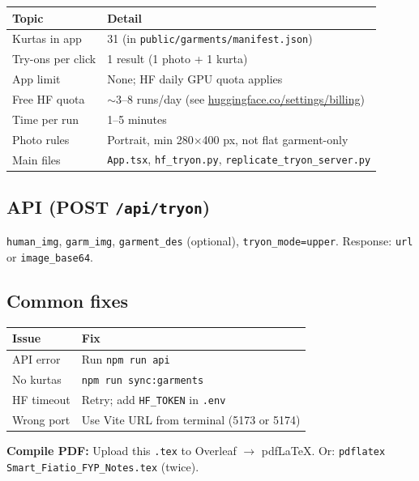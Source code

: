\documentclass[10pt,a4paper]{article}
\begin{document}
\begin{table}[h]
\centering\small
\begin{tabular}{@{}ll@{}}
\toprule
Topic & Detail \\
\midrule
Kurtas in app & 31 (in \texttt{public/garments/manifest.json}) \\
Try-ons per click & 1 result (1 photo + 1 kurta) \\
App limit & None; HF daily GPU quota applies \\
Free HF quota & $\sim$3--8 runs/day (see \url{huggingface.co/settings/billing}) \\
Time per run & 1--5 minutes \\
Photo rules & Portrait, min 280$\times$400 px, not flat garment-only \\
Main files & \texttt{App.tsx}, \texttt{hf\_tryon.py}, \texttt{replicate\_tryon\_server.py} \\
\bottomrule
\end{tabular}
\end{table}

\subsection{API (POST \texttt{/api/tryon})}
\texttt{human\_img}, \texttt{garm\_img}, \texttt{garment\_des} (optional), \texttt{tryon\_mode=upper}. Response: \texttt{url} or \texttt{image\_base64}.

\subsection{Common fixes}
\begin{tabular}{@{}p{3.2cm}p{10cm}@{}}
\toprule
Issue & Fix \\
\midrule
API error & Run \texttt{npm run api} \\
No kurtas & \texttt{npm run sync:garments} \\
HF timeout & Retry; add \texttt{HF\_TOKEN} in \texttt{.env} \\
Wrong port & Use Vite URL from terminal (5173 or 5174) \\
\bottomrule
\end{tabular}

\vspace{0.5em}
\noindent\textbf{Compile PDF:} Upload this \texttt{.tex} to Overleaf $\rightarrow$ pdfLaTeX. Or: \texttt{pdflatex Smart\_Fiatio\_FYP\_Notes.tex} (twice).
\end{document}
